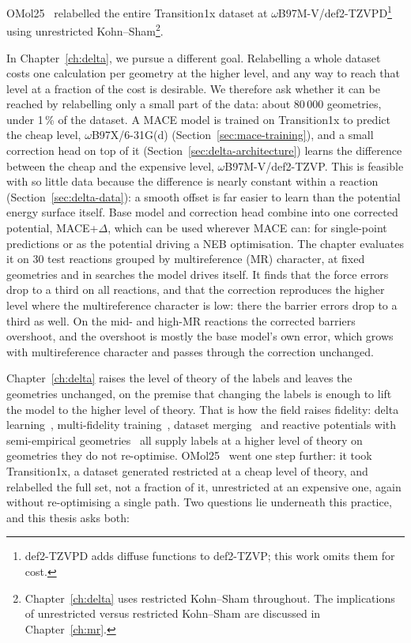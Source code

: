 OMol25~\cite{omol25} relabelled the entire Transition1x dataset at
\mbox{$\omega$B97M-V/def2-TZVPD}\footnote{def2-TZVPD adds diffuse
functions to def2-TZVP; this work omits them for cost.} using
unrestricted Kohn--Sham\footnote{Chapter~\ref{ch:delta} uses restricted
Kohn--Sham throughout. The implications of unrestricted versus
restricted Kohn--Sham are discussed in Chapter~\ref{ch:mr}.}.

In Chapter~\ref{ch:delta}, we pursue a different goal. Relabelling a
whole dataset costs one calculation per geometry at the higher level,
and any way to reach that level at a fraction of the cost is
desirable. We therefore ask whether it can be reached by relabelling
only a small part of the data: about 80\,000 geometries, under 1\,\%
of the dataset. A MACE model is trained on Transition1x to predict the cheap level,
\mbox{$\omega$B97X/6-31G(d)} (Section~\ref{sec:mace-training}), and
a small correction head on top of it
(Section~\ref{sec:delta-architecture}) learns the difference between
the cheap and the expensive level, \mbox{$\omega$B97M-V/def2-TZVP}. This is feasible with so little data because
the difference is nearly constant within a reaction
(Section~\ref{sec:delta-data}): a smooth offset is far easier to learn
than the potential energy surface itself. Base model and correction
head combine into one corrected potential, MACE+$\Delta$, which can be
used wherever MACE can: for single-point predictions or as the
potential driving a NEB optimisation. The chapter evaluates it on 30
test reactions grouped by multireference (MR) character, at fixed
geometries and in searches the model drives itself. It finds that the force errors drop to a third on all reactions, and
that the correction reproduces the higher level where the
multireference character is low: there the barrier errors drop to a
third as well. On the mid- and high-MR reactions the corrected
barriers overshoot, and the overshoot is mostly the base model's own
error, which grows with multireference character and passes through
the correction unchanged.


Chapter~\ref{ch:delta} raises the level of theory of the labels and
leaves the geometries unchanged, on the premise that changing the labels is
enough to lift the model to the higher level of theory. That is how the field raises fidelity: delta
learning~\cite{ramakrishnan2015}, multi-fidelity
training~\cite{messerly2025}, dataset merging~\cite{shiota2024} and
reactive potentials with semi-empirical geometries~\cite{ren2026} all
supply labels at a higher level of theory on geometries they do not
re-optimise. OMol25~\cite{omol25} went one step further: it took
Transition1x, a dataset generated restricted at a cheap level of
theory, and relabelled the full set, not a fraction of it,
unrestricted at an expensive one, again without re-optimising a single
path. Two questions lie underneath this
practice, and this thesis asks both:

